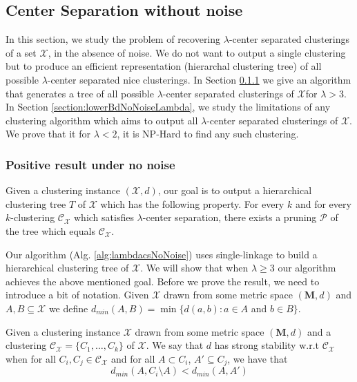 \documentclass[anon,12pt]{colt2016} %
\newcommand{\mc}{\mathcal}
\newcommand{\mb}{\mathbf}
\begin{document}
 
 
 \subsection{Center Separation without noise}
 \label{sec:cswithout}

In this section, we study the problem of recovering $\lambda$-center separated clusterings of a set $\mc X$, in the absence of noise. We do not want to output a single clustering but to produce an efficient representation (hierarchal clustering tree) of all possible $\lambda$-center separated nice clusterings. In Section \ref{section:positiveNoNoiseLambda} we give an algorithm that generates a tree of all possible $\lambda$-center separated clusterings of $\mc X$for $\lambda > 3$. In Section \ref{section:lowerBdNoNoiseLambda}, we study the limitations of any clustering algorithm which aims to output all $\lambda$-center separated clusterings of $\mc X$. We prove that it for $\lambda < 2$, it is NP-Hard to find any such clustering.


\subsubsection{Positive result under no noise}
\label{section:positiveNoNoiseLambda}
Given a clustering instance $(\mc X, d)$, our goal is to output a hierarchical clustering tree $T$ of $\mc X$ which has the following property. For every $k$ and for every $k$-clustering $\mc C_{\mc X}$ which satisfies $\lambda$-center separation, there exists a pruning $\mc P$ of the tree which equals $\mc C_{\mc X}$. 

Our algorithm (Alg. \ref{alg:lambdacsNoNoise}) uses single-linkage to build a hierarchical clustering tree of $\mc X$. We will show that when $\lambda \ge 3$ our algorithm achieves the above mentioned goal. Before we prove the result, we need to introduce a bit of notation. Given $\mc X$ drawn from some metric space $(\mb M, d)$ and $A, B \subseteq \mc X$ we define $d_{min}(A, B) = \min \{d(a, b): a \in A$ and $b \in B\}$.
\begin{definition}
Given a clustering instance $\mc X$ drawn from some metric space $(\mb M, d)$ and a clustering $\mc C_{\mc X} = \{C_1, \ldots, C_k\}$ of $\mc X$. We say that $d$ has strong stability w.r.t $\mc C_{\mc X}$ when for all $C_i, C_j \in \mc C_{\mc X}$ and for all $A \subset C_i$, $A' \subseteq C_j$, we have that 
$$d_{min}(A, C_i\setminus A) < d_{min}(A, A')$$
\end{definition}
\end{document}
